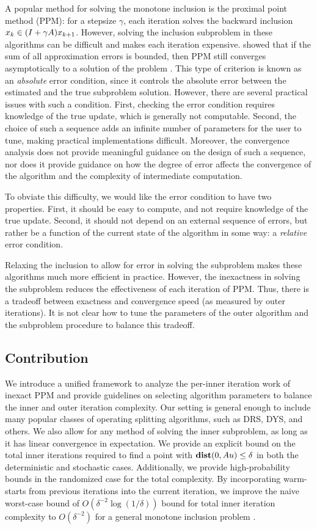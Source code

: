 \documentclass[11pt]{article}
\begin{document}
A popular method for solving the monotone inclusion  is the proximal point method (PPM): for a stepsize $\gamma$, each iteration solves the backward inclusion $x_k \in (I + \gamma{A})x_{k+1}$.
However, solving the inclusion subproblem in these algorithms can be difficult and makes each iteration expensive.
\citet{rockafellar-ppm-paper} showed that if the sum of all approximation errors is bounded, then PPM still converges asymptotically to a solution of the problem .
This type of criterion is known as an \emph{absolute} error condition, since it controls the absolute error between the estimated and the true subproblem solution.
However, there are several practical issues with such a condition.
First, checking the error condition requires knowledge of the true update, which is generally not computable.
Second, the choice of such a sequence adds an infinite number of parameters for the user to tune, making practical implementations difficult.
Moreover, the convergence analysis does not provide meaningful guidance on the design of such a sequence, nor does it provide guidance on how the degree of error affects the convergence of the algorithm and the complexity of intermediate computation.

To obviate this difficulty, we would like the error condition to have two properties.
First, it should be easy to compute, and not require knowledge of the true update.
Second, it should not depend on an external sequence of errors, but rather be a function of the current state of the algorithm in some way: a \emph{relative} error condition.

Relaxing the inclusion to allow for error in solving the subproblem makes these algorithms much more efficient in practice.
However, the inexactness in solving the subproblem reduces the effectiveness of each iteration of PPM.
Thus, there is a tradeoff between exactness and convergence speed (as measured by outer iterations).
It is not clear how to tune the parameters of the outer algorithm and the subproblem procedure to balance this tradeoff.

\subsection{Contribution}
We introduce a unified framework to analyze the per-inner iteration work of inexact PPM and provide guidelines on selecting algorithm parameters to balance the inner and outer iteration complexity.
Our setting is general enough to include many popular classes of operating splitting algorithms, such as DRS, DYS, and others.
We also allow for any method of solving the inner subproblem, as long as it has linear convergence in expectation.
We provide an explicit bound on the total inner iterations required to find a point with $\mathop{\bf dist{}}(0,{A} u)\leq\delta$ in both the deterministic and stochastic cases.
Additionally, we provide high-probability bounds in the randomized case for the total complexity.
By incorporating warm-starts from previous iterations into the current iteration, we improve the naive worst-case bound of $O(\delta^{-2}\log(1/\delta))$ bound for total inner iteration complexity to $O(\delta^{-2})$ for a general monotone inclusion problem .
\end{document}
